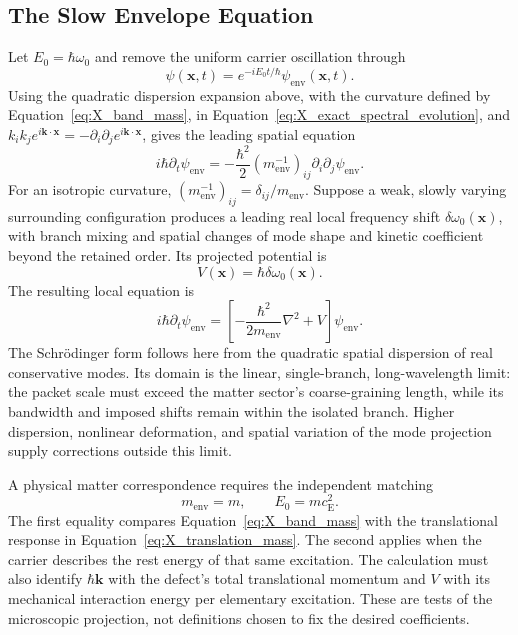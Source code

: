 \subsection{The Slow Envelope Equation}

Let $E_0=\hbar\omega_0$ and remove the uniform carrier oscillation through
\begin{equation}
    \psi(\mathbf x,t)
    =e^{-iE_0t/\hbar}\psi_{\mathrm{env}}(\mathbf x,t).
\end{equation}
Using the quadratic dispersion expansion above, with the curvature defined by Equation~\eqref{eq:X_band_mass}, in Equation~\eqref{eq:X_exact_spectral_evolution}, and $k_i k_j e^{i\mathbf k\cdot\mathbf x}=-\partial_i\partial_j e^{i\mathbf k\cdot\mathbf x}$, gives the leading spatial equation
\begin{equation}
    i\hbar\partial_t\psi_{\mathrm{env}}
    =-\frac{\hbar^2}{2}
    \left(m_{\mathrm{env}}^{-1}\right)_{ij}
    \partial_i\partial_j\psi_{\mathrm{env}}.
\end{equation}
For an isotropic curvature, $(m_{\mathrm{env}}^{-1})_{ij}=\delta_{ij}/m_{\mathrm{env}}$. Suppose a weak, slowly varying surrounding configuration produces a leading real local frequency shift $\delta\omega_0(\mathbf x)$, with branch mixing and spatial changes of mode shape and kinetic coefficient beyond the retained order. Its projected potential is
\begin{equation}
    V(\mathbf x)=\hbar\delta\omega_0(\mathbf x).
\end{equation}
The resulting local equation is
\begin{equation}
    \boxed{
    i\hbar\partial_t\psi_{\mathrm{env}}
    =\left[-\frac{\hbar^2}{2m_{\mathrm{env}}}\nabla^2+V\right]
    \psi_{\mathrm{env}}
    }.
    \label{eq:X_schrodinger_conditional}
\end{equation}
The Schr\"{o}dinger form follows here from the quadratic spatial dispersion of real conservative modes. Its domain is the linear, single-branch, long-wavelength limit: the packet scale must exceed the matter sector's coarse-graining length, while its bandwidth and imposed shifts remain within the isolated branch. Higher dispersion, nonlinear deformation, and spatial variation of the mode projection supply corrections outside this limit.

A physical matter correspondence requires the independent matching
\begin{equation}
    \boxed{
    m_{\mathrm{env}}=m,
    \qquad
    E_0=mc_{\mathrm E}^2
    }.
    \label{eq:X_matter_matching}
\end{equation}
The first equality compares Equation~\eqref{eq:X_band_mass} with the translational response in Equation~\eqref{eq:X_translation_mass}. The second applies when the carrier describes the rest energy of that same excitation. The calculation must also identify $\hbar\mathbf k$ with the defect's total translational momentum and $V$ with its mechanical interaction energy per elementary excitation. These are tests of the microscopic projection, not definitions chosen to fix the desired coefficients.

